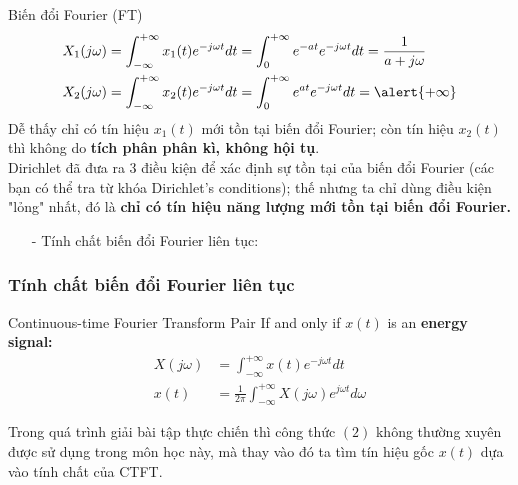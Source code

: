 \documentclass[8pt]{beamer}
\begin{document}
\begin{frame}{Biến đổi Fourier (FT)}
\begin{equation*}
\begin{split}
	X_{1}(j\omega)&=\int_{-\infty}^{+\infty}x_{1}(t)e^{-j\omega t}dt=\int_{0}^{+\infty}e^{-at}e^{-j\omega t}dt=\frac{1}{a+j\omega}\\
	X_{2}(j\omega)&=\int_{-\infty}^{+\infty}x_{2}(t)e^{-j\omega t}dt=\int_{0}^{+\infty}e^{at}e^{-j\omega t}dt=\alert{+\infty}
\end{split}
\end{equation*}
Dễ thấy chỉ có tín hiệu $x_{1}(t)$ mới tồn tại biến đổi Fourier; còn tín hiệu $x_{2}(t)$ thì không do \textbf{tích phân phân kì, không hội tụ}.
\\ Dirichlet đã đưa ra 3 điều kiện để xác định sự tồn tại của biến đổi Fourier (các bạn có thể tra từ khóa Dirichlet's conditions); thế nhưng ta chỉ dùng điều kiện "lỏng" nhất, đó là \textbf{chỉ có tín hiệu năng lượng mới tồn tại biến đổi Fourier.} 
\begin{itemize}
	\item[-] Tính chất biến đổi Fourier liên tục:
\end{itemize}
\subsubsection{Tính chất biến đổi Fourier liên tục}
\begin{block}{Continuous-time Fourier Transform Pair}
If and only if $x(t)$ is an \textbf{\alert{energy signal:}}
\begin{equation*}
\begin{split}
	X(j\omega)&=\int_{-\infty}^{+\infty}x(t)e^{-j\omega t}dt\\
	x(t)&=\frac{1}{2\pi}\int_{-\infty}^{+\infty}X(j\omega)e^{j\omega t}d\omega
	\end{split}
\end{equation*}
\end{block}
 Trong quá trình giải bài tập thực chiến thì công thức $(2)$ không thường xuyên được sử dụng trong môn học này, mà thay vào đó ta tìm tín hiệu gốc $x(t)$ dựa vào tính chất của CTFT.
\end{frame}
\end{document}
